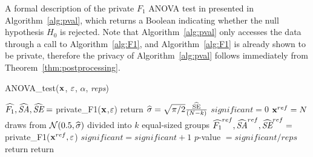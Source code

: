 A formal description of the private $F_1$ ANOVA test in presented in Algorithm~\ref{alg:pval}, which returns a Boolean indicating whether the null hypothesis $H_0$ is rejected. Note that Algorithm~\ref{alg:pval} only accesses the data through a call to Algorithm~\ref{alg:F1}, and Algorithm~\ref{alg:F1} is already shown to be private, therefore the privacy of Algorithm~\ref{alg:pval} follows immediately from Theorem~\ref{thm:postprocessing}.
\begin{algorithm}
    \caption{ANOVA\_test($\mathbf{x}$, $\varepsilon$, $\alpha$, \emph{reps})\label{alg:pval} }
    \begin{algorithmic}
        \STATE $\widehat{F_1}, \widehat{\textit{SA}}, \widehat{\textit{SE}} =$ private\_F1($\mathbf{x}$,$\varepsilon$)
        \STATE return 
        \ENDIF
        \STATE $\widehat{\sigma} = \sqrt{\pi/2}\frac{\widehat{\text{SE}}}{(N-k)}$
        \STATE $significant = 0$
        \STATE  $\mathbf{x}^{ref} = N$ draws from $\mathcal{N}(0.5, \widehat{\sigma})$ divided into $k$ equal-sized groups
        \STATE $\widehat{F_1}^{ref}, \widehat{\textit{SA}}^{ref}, \widehat{\textit{SE}}^{ref} =$ private\_F1($\mathbf{x}^{ref}, \varepsilon$)
        \STATE $significant = significant + 1$
        \ENDIF
        \ENDFOR
        \STATE $p$-value $= significant/reps$
        \STATE return 
        \ELSE 
        \STATE return 
        \ENDIF
    \end{algorithmic}
\end{algorithm}

